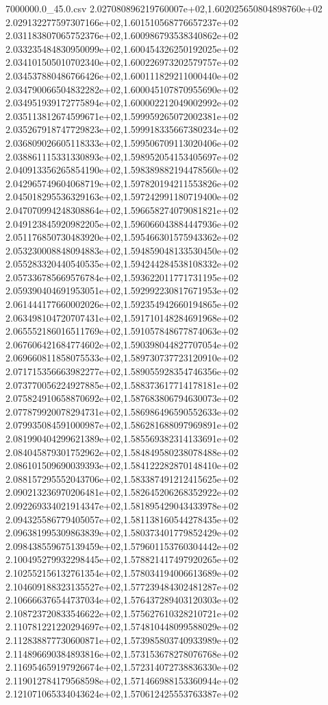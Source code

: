 \begin{filecontents*}{7000000.0_45.0.csv}
2.027080896219760007e+02,1.602025650804898760e+02
2.029132277597307166e+02,1.601510568776657237e+02
2.031183807065752376e+02,1.600986793538340862e+02
2.033235484830950099e+02,1.600454326250192025e+02
2.034101505010702340e+02,1.600226973202579757e+02
2.034537880486766426e+02,1.600111829211000440e+02
2.034790066504832282e+02,1.600045107870955690e+02
2.034951939172775894e+02,1.600002212049002992e+02
2.035113812674599671e+02,1.599959265072002381e+02
2.035267918747729823e+02,1.599918335667380234e+02
2.036809026605118333e+02,1.599506709113020406e+02
2.038861115331330893e+02,1.598952054153405697e+02
2.040913356265854190e+02,1.598389882194478560e+02
2.042965749604068719e+02,1.597820194211553826e+02
2.045018295536329163e+02,1.597242991180719400e+02
2.047070994248308864e+02,1.596658274079081821e+02
2.049123845920982205e+02,1.596066043884447936e+02
2.051176850730483920e+02,1.595466301575943362e+02
2.053230008848094883e+02,1.594859048133530450e+02
2.055283320440540535e+02,1.594244284538108332e+02
2.057336785669576784e+02,1.593622011771731195e+02
2.059390404691953051e+02,1.592992230817671953e+02
2.061444177660002026e+02,1.592354942660194865e+02
2.063498104720707431e+02,1.591710148284691968e+02
2.065552186016511769e+02,1.591057848677874063e+02
2.067606421684774602e+02,1.590398044827707054e+02
2.069660811858075533e+02,1.589730737723120910e+02
2.071715356663982277e+02,1.589055928354746356e+02
2.073770056224927885e+02,1.588373617714178181e+02
2.075824910658870692e+02,1.587683806794630073e+02
2.077879920078294731e+02,1.586986496590552633e+02
2.079935084591000987e+02,1.586281688097969891e+02
2.081990404299621389e+02,1.585569382314133691e+02
2.084045879301752962e+02,1.584849580238078488e+02
2.086101509690039393e+02,1.584122282870148410e+02
2.088157295552043706e+02,1.583387491212415625e+02
2.090213236970206481e+02,1.582645206268352922e+02
2.092269334021914347e+02,1.581895429043433978e+02
2.094325586779405057e+02,1.581138160544278435e+02
2.096381995309863839e+02,1.580373401779852429e+02
2.098438559675139459e+02,1.579601153760304442e+02
2.100495279932298445e+02,1.578821417497920265e+02
2.102552156132761354e+02,1.578034194006613689e+02
2.104609188323135527e+02,1.577239484302481287e+02
2.106666376544737034e+02,1.576437289403120303e+02
2.108723720833546622e+02,1.575627610328210721e+02
2.110781221220294697e+02,1.574810448099588029e+02
2.112838877730600871e+02,1.573985803740933989e+02
2.114896690384893816e+02,1.573153678278076768e+02
2.116954659197926674e+02,1.572314072738836330e+02
2.119012784179568598e+02,1.571466988153360944e+02
2.121071065334043624e+02,1.570612425553763387e+02

\end{filecontents*}
